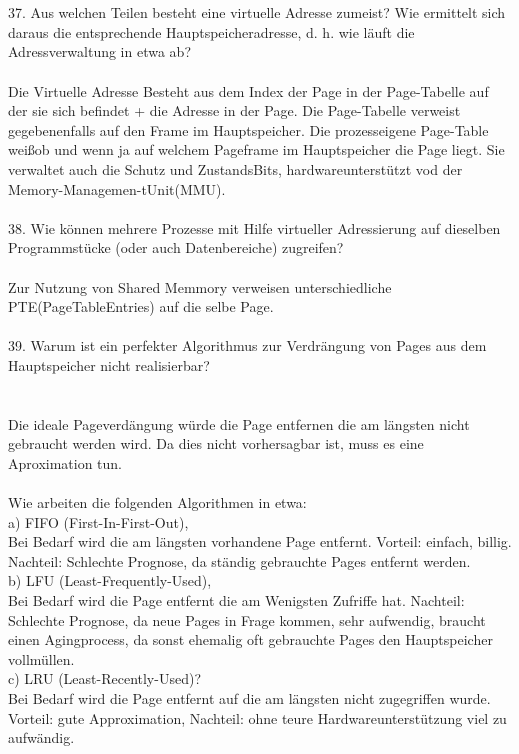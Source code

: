 \documentclass{article}
\newcommand\tab[1][1cm]{\hspace*{#1}}
\begin{document}
\\
\\
37. Aus welchen Teilen besteht eine virtuelle Adresse zumeist? Wie ermittelt sich daraus die
entsprechende Hauptspeicheradresse, d. h. wie läuft die Adressverwaltung in etwa ab?
\\
\\
Die Virtuelle Adresse Besteht aus dem Index der Page in der Page-Tabelle auf der sie sich befindet + die Adresse in der Page. Die Page-Tabelle verweist gegebenenfalls auf den Frame im Hauptspeicher.  Die prozesseigene Page-Table wei\ss ob und wenn ja auf welchem Pageframe im Hauptspeicher die Page liegt. Sie verwaltet auch die Schutz und ZustandsBits, hardwareunterst\"utzt vod der Memory-Managemen-tUnit(MMU).
\\
\\
38. Wie können mehrere Prozesse mit Hilfe virtueller Adressierung auf dieselben Programmstücke (oder auch Datenbereiche) zugreifen?
\\
\\
Zur Nutzung von Shared Memmory verweisen unterschiedliche PTE(PageTableEntries) auf die selbe Page.
\\
\\
39. Warum ist ein perfekter Algorithmus zur Verdrängung von Pages aus dem Hauptspeicher
nicht realisierbar?\\
\\
\\
Die ideale Pageverd\"angung w\"urde die Page entfernen die am l\"angsten nicht gebraucht werden wird. Da dies nicht vorhersagbar ist, muss es eine Aproximation tun.\\
\\
 Wie arbeiten die folgenden Algorithmen in etwa:\\
a) FIFO (First-In-First-Out),\\
\tab Bei Bedarf wird die am l\"angsten vorhandene Page entfernt. Vorteil: einfach, billig. Nachteil: Schlechte Prognose, da st\"andig gebrauchte Pages entfernt werden.\\
b) LFU (Least-Frequently-Used),\\
\tab Bei Bedarf wird die Page entfernt die am Wenigsten Zufriffe hat. Nachteil: Schlechte Prognose, da neue Pages in Frage kommen, sehr aufwendig, braucht einen Agingprocess, da sonst ehemalig oft gebrauchte Pages den Hauptspeicher vollm\"ullen.\\
c) LRU (Least-Recently-Used)?\\
\tab Bei Bedarf wird die Page entfernt auf die am l\"angsten nicht zugegriffen wurde. Vorteil: gute Approximation, Nachteil: ohne teure Hardwareunterst\"utzung viel zu aufw\"andig.
\end{document}
